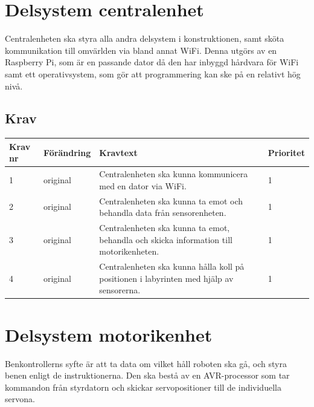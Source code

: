\documentclass[a4paper,titlepage,12pt]{article}
\begin{document}
	\section{Delsystem centralenhet}
	Centralenheten ska styra alla andra delsystem i konstruktionen, samt sköta
	kommunikation till omvärlden via bland annat WiFi. Denna utgörs av en Raspberry
	Pi, som är en passande dator då den har inbyggd hårdvara för WiFi samt
	ett operativsystem, som gör att programmering kan ske på en relativt hög nivå.

	\subsection{Krav}
	\begin{table}[h!]
		\label{tab:label}
		\begin{tabularx}{\textwidth}{|l|l|X|l|}
			\hline
			\textbf{Krav nr} & \textbf{Förändring} & \textbf{Kravtext} & \textbf{Prioritet} 
				\\ \hline

			1 & original & Centralenheten ska kunna kommunicera med en dator via WiFi. & 1
				\\ \hline

			2 & original & Centralenheten ska kunna ta emot och behandla data från sensorenheten.& 1
				\\ \hline

			3 & original & Centralenheten ska kunna ta emot, behandla och skicka information 
				till motorikenheten. & 1
				\\ \hline

			4 & original & Centralenheten ska kunna hålla koll på positionen i labyrinten 
				med hjälp av sensorerna. & 1
				\\ \hline
		\end{tabularx}
	\end{table}




	\section{Delsystem motorikenhet}
	Benkontrollerns syfte är att ta data om vilket håll roboten ska gå, och styra benen enligt de
	instruktionerna. Den ska bestå av en AVR-processor som tar kommandon från styrdatorn och skickar
	servopositioner till de individuella servona.
\end{document}

